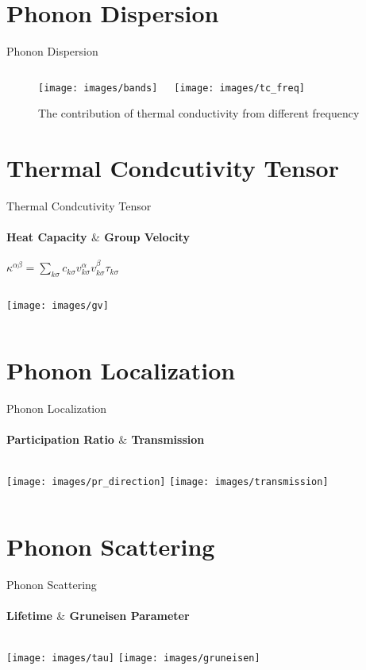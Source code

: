 \documentclass{beamer}
\begin{document}
\section{Phonon Dispersion}
\begin{frame}{Phonon Dispersion}
  \begin{figure}[b]
    \begin{columns}[onlytextwidth]
      \texttt{[image: images/bands]}
      \caption{\label{fig:bands} $\Gamma(0.0, 0.0, 0.0)$, $X(0.5, 0.0, 0.0)$,  $Y(0.0, 0.5, 0.0)$}
      \texttt{[image: images/tc\_freq]}
      \caption{\label{fig:freq} The contribution of thermal conductivity from different frequency }
    \end{columns}
  \end{figure}
\end{frame}

\section{Thermal Condcutivity Tensor}
\begin{frame}{Thermal Condcutivity Tensor}
  \framesubtitle{Heat Capacity $\&$ Group Velocity}%
  $\kappa^{\alpha\beta} = \sum_{k \sigma}{c_{k \sigma}v^{\alpha}_{k \sigma}v^{\beta}_{k \sigma}\tau_{k \sigma}}$

  \begin{columns}[onlytextwidth]
    \texttt{[image: images/gv]}
  \end{columns}
\end{frame}

\section{Phonon Localization}
\begin{frame}{Phonon Localization}
  \framesubtitle{Participation Ratio $\&$ Transmission}%
  \begin{columns}[onlytextwidth]
    \texttt{[image: images/pr\_direction]}
    \texttt{[image: images/transmission]}
  \end{columns}
\end{frame}

\section{Phonon Scattering}
\begin{frame}{Phonon Scattering}
  \framesubtitle{Lifetime $\&$ Gruneisen Parameter}%
  \begin{columns}[onlytextwidth]
    \texttt{[image: images/tau]}
    \texttt{[image: images/gruneisen]}
  \end{columns}
\end{frame}
\end{document}
